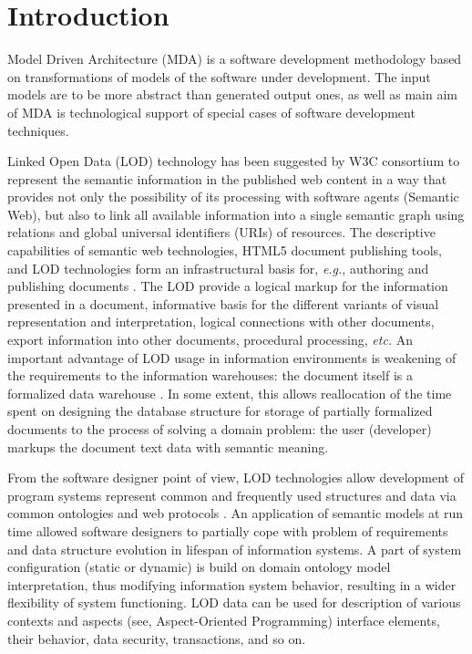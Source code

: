 \documentclass[runningheads]{llncs}
\begin{document}
\section{Introduction}

Model Driven Architecture (MDA) is a software development methodology based on transformations of models of the software under development.  The input models are to be more abstract than generated output ones, as well as main aim of MDA is technological support of special cases of software development techniques.

Linked Open Data (LOD) \cite{Bizer} technology has been suggested by W3C consortium to represent the semantic information in the published web content in a way that provides not only the possibility of its processing with software agents (Semantic Web), but also to link all available information into a single semantic graph using relations and global universal identifiers (URIs) of resources. The descriptive capabilities of semantic web technologies, HTML5 document publishing tools, and LOD technologies form an infrastructural basis for, \emph{e.g.}, authoring and publishing documents \cite{Capadisli}. The LOD provide a logical markup for the information presented in a document, informative basis for the different variants of visual representation and interpretation, logical connections with other documents, export information into other documents, procedural processing, \emph{etc.} An important advantage of LOD usage in information environments is weakening of the requirements to the information warehouses: the document itself is a formalized data warehouse \cite{Cherk}. In some extent, this allows reallocation of the time spent on designing the database structure for storage of partially formalized documents to the process of solving a domain problem: the user (developer) markups the document text data with semantic meaning.

From the software designer point of view, LOD technologies allow development of program systems represent common and frequently used structures and data via common ontologies and web protocols \cite{Cherk}.  An application of semantic models at run time \cite{Kopay} allowed software designers to partially cope with problem of requirements and data structure evolution in lifespan of information systems.  A part of system configuration (static or dynamic) is build on domain ontology model interpretation, thus modifying information system behavior, resulting in a wider flexibility of system functioning.  LOD data can be used for description of various contexts and aspects (see, Aspect-Oriented Programming) interface elements, their behavior, data security, transactions, and so on.
\end{document}

